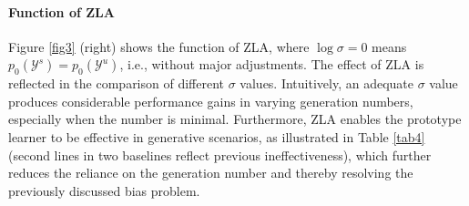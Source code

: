 \documentclass{article}
\begin{document}
    	\begin{table}[t]
		\centering
        	\vspace{-0.5ex}
		\caption{\textbf{Vanilla softmax classifier} vs. \textbf{prototype learner}, based on WGAN, where L.N. represents a large generation number.}
        	\vspace{-2ex}  
		\label{tab4}
	\end{table}

\paragraph{Function of ZLA}
Figure \ref{fig3} (right) shows the function of ZLA, where $\log \sigma=0$ means $p_0(\mathcal{Y}^s)=p_0(\mathcal{Y}^u)$, i.e., without major adjustments. The effect of ZLA is reflected in the comparison of different $\sigma$ values. Intuitively, an adequate $\sigma$ value produces considerable performance gains in varying generation numbers, especially when the number is minimal. Furthermore, ZLA enables the prototype learner to be effective in generative scenarios, as illustrated in Table \ref{tab4} (second lines in two baselines reflect previous ineffectiveness), which further reduces the reliance on the generation number and thereby resolving the previously discussed bias problem.
    
\end{document}
